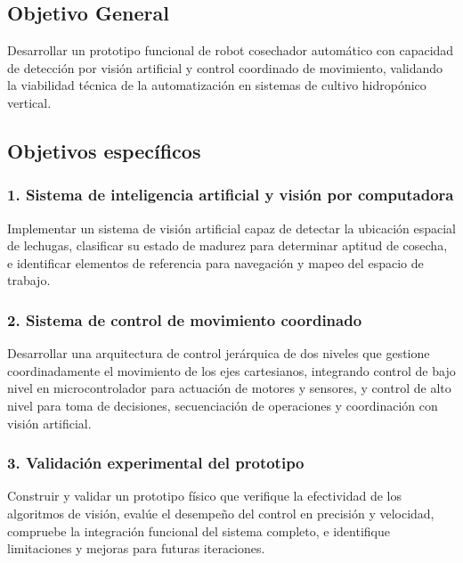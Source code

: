 
\subsection*{Objetivo General}

Desarrollar un prototipo funcional de robot cosechador automático con capacidad de detección por visión artificial y control coordinado de movimiento, validando la viabilidad técnica de la automatización en sistemas de cultivo hidropónico vertical.

\subsection*{Objetivos específicos}

\subsubsection*{1. Sistema de inteligencia artificial y visión por computadora}

Implementar un sistema de visión artificial capaz de detectar la ubicación espacial de lechugas, clasificar su estado de madurez para determinar aptitud de cosecha, e identificar elementos de referencia para navegación y mapeo del espacio de trabajo.

\subsubsection*{2. Sistema de control de movimiento coordinado}

Desarrollar una arquitectura de control jerárquica de dos niveles que gestione coordinadamente el movimiento de los ejes cartesianos, integrando control de bajo nivel en microcontrolador para actuación de motores y sensores, y control de alto nivel para toma de decisiones, secuenciación de operaciones y coordinación con visión artificial.

\subsubsection*{3. Validación experimental del prototipo}

Construir y validar un prototipo físico que verifique la efectividad de los algoritmos de visión, evalúe el desempeño del control en precisión y velocidad, compruebe la integración funcional del sistema completo, e identifique limitaciones y mejoras para futuras iteraciones.